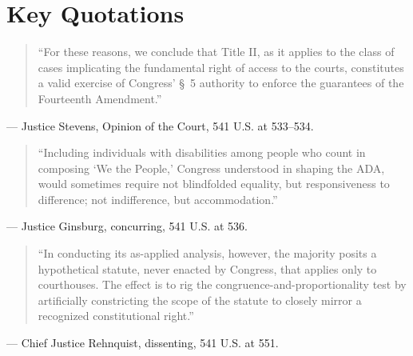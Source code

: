 \documentclass[12pt]{article}
\begin{document}
\section{Key Quotations}

\begin{quote}
``For these reasons, we conclude that Title II, as it applies to the class of cases implicating the fundamental right of access to the courts, constitutes a valid exercise of Congress' \S~5 authority to enforce the guarantees of the Fourteenth Amendment.''
\end{quote}
\noindent --- Justice Stevens, Opinion of the Court, 541 U.S. at 533--534.

\begin{quote}
``Including individuals with disabilities among people who count in composing `We the People,' Congress understood in shaping the ADA, would sometimes require not blindfolded equality, but responsiveness to difference; not indifference, but accommodation.''
\end{quote}
\noindent --- Justice Ginsburg, concurring, 541 U.S. at 536.

\begin{quote}
``In conducting its as-applied analysis, however, the majority posits a hypothetical statute, never enacted by Congress, that applies only to courthouses. The effect is to rig the congruence-and-proportionality test by artificially constricting the scope of the statute to closely mirror a recognized constitutional right.''
\end{quote}
\noindent --- Chief Justice Rehnquist, dissenting, 541 U.S. at 551.
\end{document}
